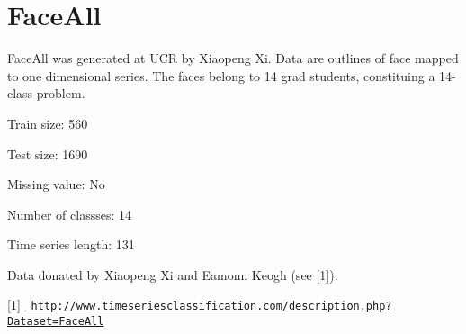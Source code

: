 \chapter{Face\+All}
\hypertarget{md_external_2data_2UCRArchive__2018_2FaceAll_2README}{}\label{md_external_2data_2UCRArchive__2018_2FaceAll_2README}
\label{md_external_2data_2UCRArchive__2018_2FaceAll_2README_autotoc_md69}%
%
 Face\+All was generated at UCR by Xiaopeng Xi. Data are outlines of face mapped to one dimensional series. The faces belong to 14 grad students, constituing a 14-\/class problem.

Train size\+: 560

Test size\+: 1690

Missing value\+: No

Number of classses\+: 14

Time series length\+: 131

Data donated by Xiaopeng Xi and Eamonn Keogh (see \mbox{[}1\mbox{]}).

\mbox{[}1\mbox{]} \href{http://www.timeseriesclassification.com/description.php?Dataset=FaceAll}{\texttt{ http\+://www.\+timeseriesclassification.\+com/description.\+php?\+Dataset=\+Face\+All}} 